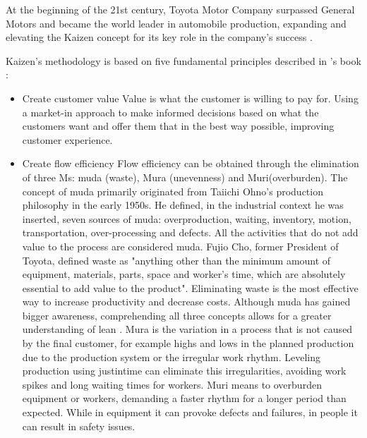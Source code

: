 \documentclass[]{article}
\begin{document}
At the beginning of the 21st century, Toyota Motor Company surpassed General Motors and
became the world leader in automobile production, expanding and elevating the Kaizen concept
for its key role in the company’s success \cite{netland_routledge_2016}. 

Kaizen’s methodology is based on five fundamental principles described in \citeauthor{massaki_gemba_2015}'s book \cite{massaki_gemba_2015} :
\begin{itemize}
  \item Create customer value
    \subitem Value is what the customer is willing to pay for. Using a market-in approach to make
informed decisions based on what the customers want and offer them that in the best way
possible, improving customer experience.
  
  \item Create flow efficiency
    \subitem Flow efficiency can be obtained through the elimination of three Ms: \gls{muda} (waste), Mura (unevenness) and Muri(overburden).
    The concept of \gls{muda} primarily originated from Taiichi Ohno’s production philosophy in the
    early 1950s. He defined, in the industrial context he was inserted, seven sources of \gls{muda}:
    overproduction, waiting, inventory, motion, transportation, over-processing and defects. All
    the activities that do not add value to the process are considered \gls{muda}. Fujio Cho, former
    President of Toyota, defined waste as "anything other than the minimum amount of equipment, materials, parts, space and worker’s time, which are absolutely essential to add value
    to the product". Eliminating waste is the most effective way to increase productivity and
    decrease costs.
    Although \gls{muda} has gained bigger awareness, comprehending all three concepts allows for
    a greater understanding of \gls{lean} \cite{netland_routledge_2016}. Mura is the variation in a
    process that is not caused by the final customer, for example highs and lows in the planned
    production due to the production system or the irregular work rhythm. Leveling production
    using \gls{justintime} can eliminate this irregularities, avoiding work spikes and long waiting times for
    workers. Muri means to overburden equipment or workers, demanding a faster rhythm for
    a longer period than expected. While in equipment it can provoke defects and failures, in
    people it can result in safety issues.


\end{itemize}
\end{document}
